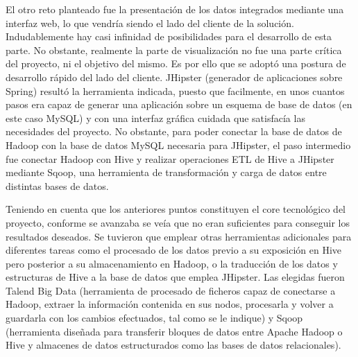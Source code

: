 El otro reto planteado fue la presentación de los datos integrados mediante una interfaz web, lo que vendría siendo el lado del cliente de la solución. Indudablemente hay casi infinidad de posibilidades para el desarrollo de esta parte. No obstante, realmente la parte de visualización no fue una parte crítica del proyecto, ni el objetivo del mismo. Es por ello que se adoptó una postura de desarrollo rápido del lado del cliente. JHipster (generador de aplicaciones sobre Spring) resultó la herramienta indicada, puesto que facilmente, en unos cuantos pasos era capaz de generar una aplicación sobre un esquema de base de datos (en este caso MySQL) y con una interfaz gráfica cuidada que satisfacía las necesidades del proyecto. No obstante, para poder conectar la base de datos de Hadoop con la base de datos MySQL necesaria para JHipster, el paso intermedio fue conectar Hadoop con Hive y realizar operaciones ETL de Hive a JHipster mediante Sqoop, una herramienta de transformación y carga de datos entre distintas bases de datos.\par
Teniendo en cuenta que los anteriores puntos constituyen el core tecnológico del proyecto, conforme se avanzaba se veía que no eran suficientes para conseguir los resultados deseados. Se tuvieron que emplear otras herramientas adicionales para diferentes tareas como el procesado de los datos previo a su exposición en Hive pero posterior a su almacenamiento en Hadoop, o la traducción de los datos y estructuras de Hive a la base de datos que emplea JHipster. Las elegidas fueron Talend Big Data (herramienta de procesado de ficheros capaz de conectarse a Hadoop,  extraer la información contenida en sus nodos, procesarla y volver a guardarla con los cambios efectuados, tal como se le indique) y Sqoop (herramienta diseñada para transferir bloques de datos entre Apache Hadoop o Hive y almacenes de datos estructurados como las bases de datos relacionales). 

